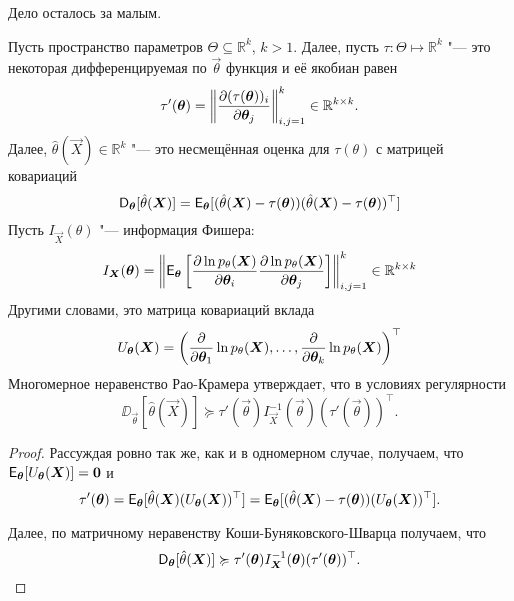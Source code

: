 Дело осталось за малым.
\begin{theorem}
	Пусть пространство параметров $\Theta \subseteq \mathbb{R}^{k}$, $k > 1$. Далее, пусть $\tau \colon \Theta \mapsto \mathbb{R}^{k}$ "--- это некоторая дифференцируемая по $\vec{\theta}$ функция и её якобиан равен
	\[
		\tau'(\bm{\theta}) = \left\|\pdv{(\tau(\bm{\theta}))_{i}}{\bm{\theta}_{j}}\right\|_{i, j = 1}^{k} \in \mathbb{R}^{k \times k}.
	\]
	Далее, $\hat{\theta}(\vec{X}) \in \mathbb{R}^{k}$ "--- это несмещённая оценка для $\tau(\theta)$ с матрицей ковариаций
	\[
		\operatorname{\mathsf{D}}_{\bm{\theta}}[\hat{\theta}(\bm{X})] = \operatorname{\mathsf{E}}_{\bm{\theta}}[(\hat{\theta}(\bm{X}) - \tau(\bm{\theta}))(\hat{\theta}(\bm{X}) - \tau(\bm{\theta}))^{\top}]
	\]
	Пусть $I_{\vec{X}}(\theta)$ "--- информация Фишера:
	\[
		I_{\bm{X}}(\bm{\theta}) = \left\|\operatorname{\mathsf{E}}_{\bm{\theta}}\left[\pdv{\ln p_{\theta}(\bm{X})}{\bm{\theta}_{i}} \pdv{\ln p_{\theta}(\bm{X})}{\bm{\theta}_{j}}\right]\right\|_{i, j = 1}^{k} \in \mathbb{R}^{k \times k}
	\]
	Другими словами, это матрица ковариаций вклада
	\[
		U_{\bm{\theta}}(\bm{X}) =  \left(\pdv{\bm{\theta}_{1}} \ln p_{\theta}(\bm{X}), \ldots, \pdv{\bm{\theta}_{k}} \ln p_{\theta}(\bm{X})\right)^{\top}
	\]
	Многомерное неравенство Рао-Крамера утверждает, что в условиях регулярности
	\[
		\DD_{\vec{\theta}}[\hat{\theta}(\vec{X})] \succcurlyeq \tau'(\vec{\theta})I_{\vec{X}}^{-1}(\vec{\theta})(\tau'(\vec{\theta}))^{\top}.
	\]
\end{theorem}
\begin{proof}
	Рассуждая ровно так же, как и в одномерном случае, получаем, что $\operatorname{\mathsf{E}}_{\bm{\theta}}[U_{\bm{\theta}}(\bm{X})] = \bm{0}$ и
	\[
		\tau'(\bm{\theta}) 
		= \operatorname{\mathsf{E}}_{\bm{\theta}}[\hat{\theta}(\bm{X})(U_{\bm{\theta}}(\bm{X}))^{\top}]
		= \operatorname{\mathsf{E}}_{\bm{\theta}}[(\hat{\theta}(\bm{X}) - \tau(\bm{\theta}))(U_{\bm{\theta}}(\bm{X}))^{\top}].
	\]
	
	Далее, по матричному неравенству Коши-Буняковского-Шварца получаем, что
	\[
		\operatorname{\mathsf{D}}_{\bm{\theta}}[\hat{\theta}(\bm{X})] \succcurlyeq \tau'(\bm{\theta})I_{\bm{X}}^{-1}(\bm{\theta})(\tau'(\bm{\theta}))^{\top}. \qedhere
	\]
	
\end{proof}